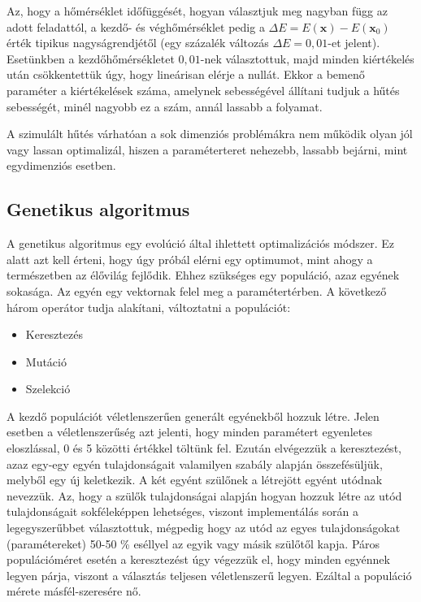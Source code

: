 \documentclass[12pt]{article}
\begin{document}
Az, hogy a hőmérséklet időfüggését, hogyan választjuk meg nagyban függ az adott feladattól, a kezdő- és véghőmérséklet pedig a $\Delta E = E(\mathbf{x}) - E(\mathbf{x}_0)$ érték tipikus nagyságrendjétől (egy százalék változás $\Delta E = 0,01$-et jelent). %
Esetünkben a kezdőhőmérsékletet $0,01$-nek választottuk, majd minden kiértékelés után csökkentettük úgy, hogy lineárisan elérje a nullát. Ekkor a bemenő paraméter a kiértékelések száma, amelynek sebességével állítani tudjuk a hűtés sebességét, minél nagyobb ez a szám, annál lassabb a folyamat.

A szimulált hűtés várhatóan a sok dimenziós problémákra nem működik olyan jól vagy lassan optimalizál, hiszen a paraméterteret nehezebb, lassabb bejárni, mint egydimenziós esetben. %

\subsection{Genetikus algoritmus}
A genetikus algoritmus \cite{whitley1994genetic} egy evolúció által ihlettett optimalizációs módszer. Ez alatt azt kell érteni, hogy úgy próbál elérni egy optimumot, mint ahogy a természetben az élővilág fejlődik. Ehhez szükséges egy populáció, azaz egyének sokasága. Az egyén egy vektornak felel meg a paramétertérben. A következő három operátor tudja alakítani, változtatni a populációt:
\begin{itemize}
	\item Keresztezés
	\item Mutáció
	\item Szelekció
\end{itemize}
A kezdő populációt véletlenszerűen generált egyénekből hozzuk létre. Jelen esetben a véletlenszerűség azt jelenti, hogy minden paramétert egyenletes eloszlással,  0 és 5 közötti értékkel töltünk fel. Ezután elvégezzük a keresztezést, azaz egy-egy egyén tulajdonságait valamilyen szabály alapján összefésüljük, melyből egy új keletkezik. A két egyént szülőnek a létrejött egyént utódnak nevezzük. Az, hogy a szülők tulajdonságai alapján hogyan hozzuk létre az utód tulajdonságait sokféleképpen lehetséges, viszont implementálás során a legegyszerűbbet választottuk, mégpedig hogy az utód az egyes tulajdonságokat (paramétereket) 50-50 \% eséllyel az egyik vagy másik szülőtől kapja. Páros populációméret esetén a keresztezést úgy végezzük el, hogy minden egyénnek legyen párja, viszont a választás teljesen véletlenszerű legyen. Ezáltal a populáció mérete másfél-szeresére nő.
\end{document}
